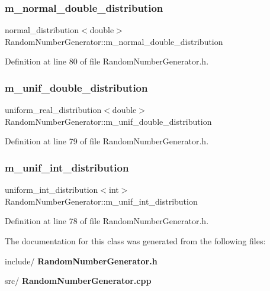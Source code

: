 \subsubsection{m\+\_\+normal\+\_\+double\+\_\+distribution}
{\footnotesize\ttfamily normal\+\_\+distribution$<$double$>$ Random\+Number\+Generator\+::m\+\_\+normal\+\_\+double\+\_\+distribution\hspace{0.3cm}{\ttfamily [private]}}



Definition at line 80 of file Random\+Number\+Generator.\+h.

\mbox{\label{class_random_number_generator_ab7697a4a0f3efe902aa49828bd78f1e2}} 
\subsubsection{m\+\_\+unif\+\_\+double\+\_\+distribution}
{\footnotesize\ttfamily uniform\+\_\+real\+\_\+distribution$<$double$>$ Random\+Number\+Generator\+::m\+\_\+unif\+\_\+double\+\_\+distribution\hspace{0.3cm}{\ttfamily [private]}}



Definition at line 79 of file Random\+Number\+Generator.\+h.

\mbox{\label{class_random_number_generator_a7a3a5b9bfbb1306f364704bc3a9860b6}} 
\subsubsection{m\+\_\+unif\+\_\+int\+\_\+distribution}
{\footnotesize\ttfamily uniform\+\_\+int\+\_\+distribution$<$int$>$ Random\+Number\+Generator\+::m\+\_\+unif\+\_\+int\+\_\+distribution\hspace{0.3cm}{\ttfamily [private]}}



Definition at line 78 of file Random\+Number\+Generator.\+h.



The documentation for this class was generated from the following files\+:\begin{DoxyCompactItemize}
\item 
include/\textbf{ Random\+Number\+Generator.\+h}\item 
src/\textbf{ Random\+Number\+Generator.\+cpp}\end{DoxyCompactItemize}
